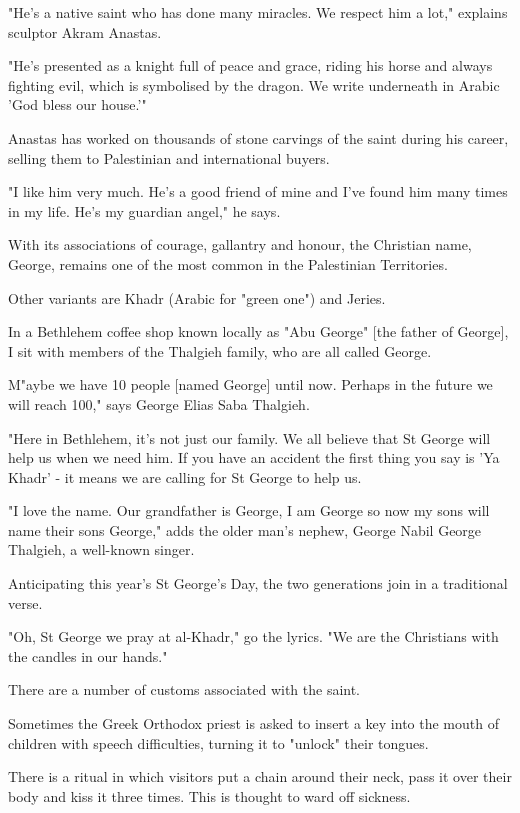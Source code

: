 \documentclass[letterpaper]{report}
\begin{document}
\begin{multicols}{2}
"He's a native saint who has done many miracles. We respect him a lot," explains sculptor Akram Anastas.

"He's presented as a knight full of peace and grace, riding his horse and always fighting evil, which is symbolised by the dragon. We write underneath in Arabic 'God bless our house.'"

Anastas has worked on thousands of stone carvings of the saint during his career, selling them to Palestinian and international buyers.

"I like him very much. He's a good friend of mine and I've found him many times in my life. He's my guardian angel," he says.


With its associations of courage, gallantry and honour, the Christian name, George, remains one of the most common in the Palestinian Territories.

Other variants are Khadr (Arabic for "green one") and Jeries.

In a Bethlehem coffee shop known locally as "Abu George" [the father of George], I sit with members of the Thalgieh family, who are all called George.

M"aybe we have 10 people [named George] until now. Perhaps in the future we will reach 100," says George Elias Saba Thalgieh.

"Here in Bethlehem, it's not just our family. We all believe that St George will help us when we need him. If you have an accident the first thing you say is 'Ya Khadr' - it means we are calling for St George to help us.

"I love the name. Our grandfather is George, I am George so now my sons will name their sons George," adds the older man's nephew, George Nabil George Thalgieh, a well-known singer.

Anticipating this year's St George's Day, the two generations join in a traditional verse.

"Oh, St George we pray at al-Khadr," go the lyrics. "We are the Christians with the candles in our hands."

There are a number of customs associated with the saint.

Sometimes the Greek Orthodox priest is asked to insert a key into the mouth of children with speech difficulties, turning it to "unlock" their tongues.

There is a ritual in which visitors put a chain around their neck, pass it over their body and kiss it three times. This is thought to ward off sickness.


\end{multicols}
\end{document}
